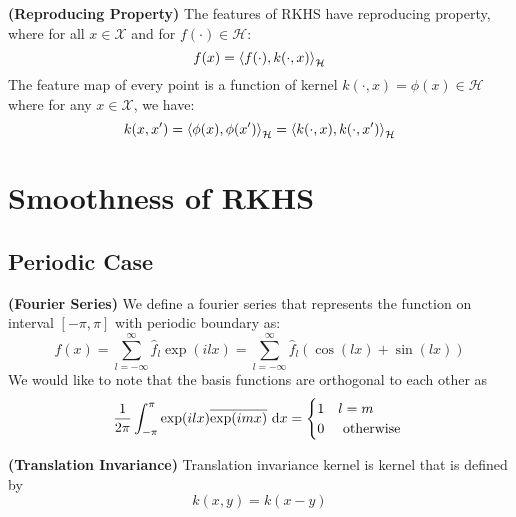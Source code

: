 \begin{definition}{\textbf{(Reproducing Property)}}
    The features of RKHS have reproducing property, where for all $x\in\mathcal{X}$ and for $f(\cdot)\in\mathcal{H}$:
    \begin{equation*}
        f(x) = \left\langle f(\cdot), k(\cdot, x) \right\rangle_\mathcal{H}
    \end{equation*}
    The feature map of every point is a function of kernel $k(\cdot, x) = \phi(x)\in\mathcal{H}$ where for any $x\in\mathcal{X}$, we have:
    \begin{equation*}
        k(x,x') = \left\langle \phi(x), \phi(x') \right\rangle_\mathcal{H} = \left\langle k(\cdot,x), k(\cdot, x') \right\rangle_\mathcal{H}
    \end{equation*}
\end{definition}

\section{Smoothness of RKHS}

\subsection{Periodic Case}

\begin{definition}{\textbf{(Fourier Series)}}
    We define a fourier series that represents the function on interval $[-\pi, \pi]$ with periodic boundary as:
    \begin{equation*}
        f(x) = \sum^\infty_{l=-\infty} \hat{f}_l \exp(ilx) = \sum^\infty_{l=-\infty}\hat{f}_l(\cos(lx) + \sin(lx))
    \end{equation*}
    We would like to note that the basis functions are orthogonal to each other as 
    \begin{equation*}
        \frac{1}{2\pi}\int^\pi_{-\pi}\exp(ilx)\overline{\exp(imx)}\ \mathrm{d} x = \begin{cases}
            1 & l=m \\
            0 & \text{ otherwise }
        \end{cases}
    \end{equation*}
\end{definition}

\begin{definition}{\textbf{(Translation Invariance)}}
    Translation invariance kernel is kernel that is defined by 
    \begin{equation*}
        k(x, y)= k(x-y)    
    \end{equation*}
\end{definition}

